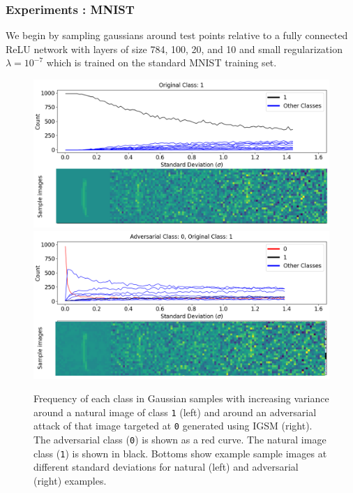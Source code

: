 \begin{frame}
  \frametitle{Experiments : MNIST}
   We begin by sampling gaussians around test points relative to a fully connected ReLU network with layers of size
   784, 100, 20, and 10 and small regularization $\lambda = 10^{-7}$
   which is trained on the standard MNIST training set. \\


 \begin{figure}[!ht]
   \includegraphics[width = .49\textwidth]{c3_figures/MNIST1.png}
   \includegraphics[width = .49\textwidth]{c3_figures/MNIST10.png}
 \caption{Frequency of each class in Gaussian samples with increasing variance around a natural image of class \texttt{1} (left) and around an adversarial attack of that image targeted at \texttt{0} generated using IGSM (right). The adversarial class (\texttt{0}) is shown as a red curve. The natural image class (\texttt{1}) is shown in black. Bottoms show example sample images at different standard deviations for natural (left) and adversarial (right) examples.}\label{fgsmo}
\end{figure}
\end{frame}

